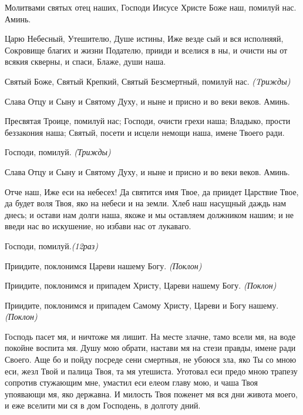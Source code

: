  


Молитвами святых отец наших, Господи Иисусе Христе Боже наш, помилуй нас. Аминь.


Царю Небесный, Утешителю, Душе истины, Иже везде сый и вся исполняяй, Сокровище благих и жизни Подателю, прииди и вселися в ны, и очисти ны от всякия скверны, и спаси, Блаже, души наша.


Святый Боже, Святый Крепкий, Святый Безсмертный, помилуй нас. \itshape (Tрижды)\normalfont{}


Слава Отцу и Сыну и Святому Духу, и ныне и присно и во веки веков. Аминь.


Пресвятая Троице, помилуй нас; Господи, очисти грехи наша; Владыко, прости беззакония наша; Святый, посети и исцели немощи наша, имене Твоего ради.


Господи, помилуй. \itshape (Трижды)\normalfont{}


Слава Отцу и Сыну и Святому Духу, и ныне и присно и во веки веков. Аминь.


Отче наш, Иже еси на небесех! Да святится имя Твое, да приидет Царствие Твое, да будет воля Твоя, яко на небеси и на земли. Хлеб наш насущный даждь нам днесь; и остави нам долги наша, якоже и мы оставляем должником нашим; и не введи нас во искушение, но избави нас от лукаваго.


Господи, помилуй.\itshape  (12раз)\normalfont{}


Приидите, поклонимся Цареви нашему Богу. \itshape (Поклон)\normalfont{}


Приидите, поклонимся и припадем Христу, Цареви нашему Богу. \itshape (Поклон)\normalfont{}


Приидите, поклонимся и припадем Самому Христу, Цареви и Богу нашему.\itshape (Поклон)\normalfont{}




Господь пасет мя, и ничтоже мя лишит. На месте злачне, тамо всели мя, на воде покойне воспита мя. Душу мою обрати, настави мя на стези правды, имене ради Своего. Аще бо и пойду посреде сени смертныя, не убоюся зла, яко Ты со мною еси, жезл Твой и палица Твоя, та мя утешиста. Уготовал еси предо мною трапезу сопротив стужающим мне, умастил еси елеом главу мою, и чаша Твоя упоявающи мя, яко державна. И милость Твоя поженет мя вся дни живота моего, и еже вселити ми ся в дом Господень, в долготу дний.





